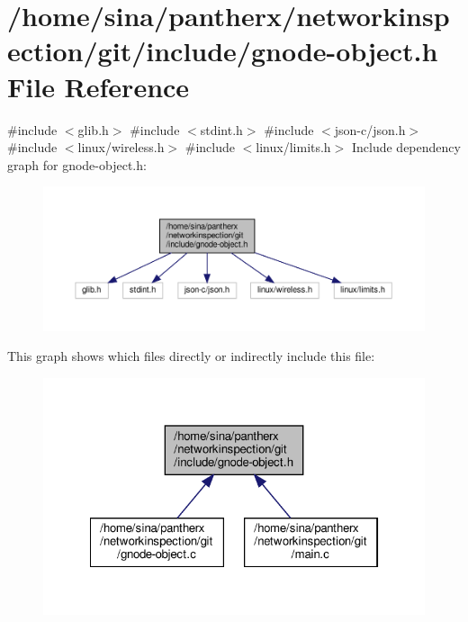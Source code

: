 \hypertarget{gnode-object_8h}{}\section{/home/sina/pantherx/networkinspection/git/include/gnode-\/object.h File Reference}
\label{gnode-object_8h}
{\ttfamily \#include $<$glib.\+h$>$}\newline
{\ttfamily \#include $<$stdint.\+h$>$}\newline
{\ttfamily \#include $<$json-\/c/json.\+h$>$}\newline
{\ttfamily \#include $<$linux/wireless.\+h$>$}\newline
{\ttfamily \#include $<$linux/limits.\+h$>$}\newline
Include dependency graph for gnode-\/object.h\+:\nopagebreak
\begin{figure}[H]
\begin{center}
\leavevmode
\includegraphics[width=350pt]{gnode-object_8h__incl}
\end{center}
\end{figure}
This graph shows which files directly or indirectly include this file\+:\nopagebreak
\begin{figure}[H]
\begin{center}
\leavevmode
\includegraphics[width=322pt]{gnode-object_8h__dep__incl}
\end{center}
\end{figure}
